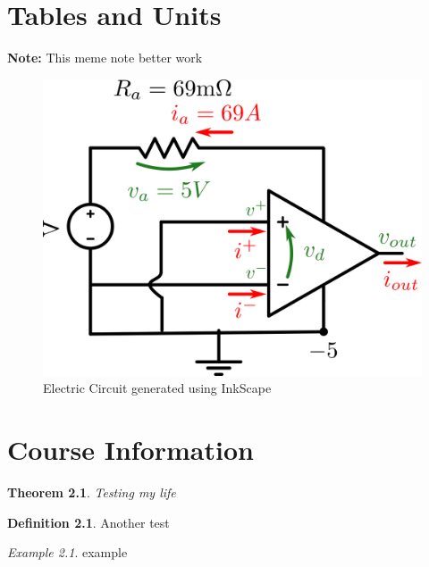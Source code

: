 \documentclass{report}
\newenvironment{note}%
{\begin{siderule}\textbf{Note:}}
	{\end{siderule}}
\theoremstyle{plain}
\newtheorem{theorem}{Theorem}[section]
\theoremstyle{definition}
\newtheorem{definition}{Definition}[section]
\theoremstyle{remark}
\newtheorem{example}{Example}[section]
\begin{document}
\chapter{Tables and Units}

\begin{note}
	This meme note better work
\end{note}



\begin{figure}
	\centering
	\includegraphics[width=1\linewidth]{Inkscape/electricCircuit.png}
	\caption{Electric Circuit generated using InkScape}
	\label{fig:electriccircuit}
\end{figure}

\chapter{Course Information}
\begin{theorem}{}{}
	Testing my life
\end{theorem}

\begin{definition}{}{}
	Another test
\end{definition}

\begin{example}{}{}
	example
\end{example}
\end{document}
